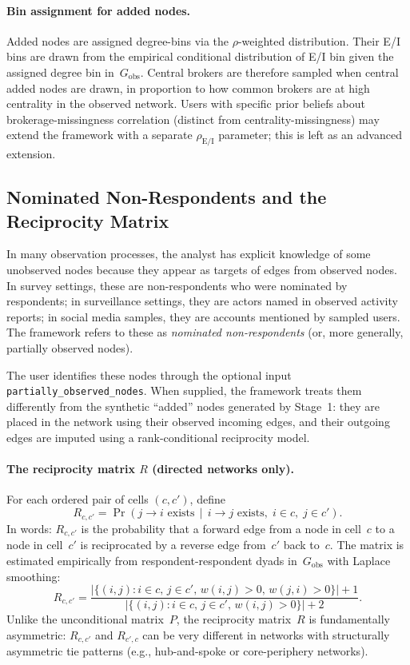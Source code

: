 \documentclass[11pt]{article}
\newcommand{\Gobs}{G_{\text{obs}}}
\newcommand{\EI}{\text{E/I}}
\newcommand{\Rmat}{R}
\newcommand{\Pmat}{P}
\begin{document}
\paragraph{Bin assignment for added nodes.} Added nodes are assigned degree-bins via the $\rho$-weighted distribution. Their E/I bins are drawn from the empirical conditional distribution of E/I bin given the assigned degree bin in~$\Gobs$. Central brokers are therefore sampled when central added nodes are drawn, in proportion to how common brokers are at high centrality in the observed network. Users with specific prior beliefs about brokerage-missingness correlation (distinct from centrality-missingness) may extend the framework with a separate $\rho_{\EI}$ parameter; this is left as an advanced extension.

\subsection{Nominated Non-Respondents and the Reciprocity Matrix}
\label{sec:nominated}

In many observation processes, the analyst has explicit knowledge of some unobserved nodes because they appear as targets of edges from observed nodes. In survey settings, these are non-respondents who were nominated by respondents; in surveillance settings, they are actors named in observed activity reports; in social media samples, they are accounts mentioned by sampled users. The framework refers to these as \emph{nominated non-respondents} (or, more generally, partially observed nodes).

The user identifies these nodes through the optional input \texttt{partially\_observed\_nodes}. When supplied, the framework treats them differently from the synthetic ``added'' nodes generated by Stage~1: they are placed in the network using their observed incoming edges, and their outgoing edges are imputed using a rank-conditional reciprocity model.

\paragraph{The reciprocity matrix $\Rmat$ (directed networks only).} For each ordered pair of cells $(c, c')$, define
\[
\Rmat_{c, c'} = \Pr\left( j \to i \text{ exists} \,\middle|\, i \to j \text{ exists}, \; i \in c, \; j \in c' \right).
\]
In words: $\Rmat_{c, c'}$ is the probability that a forward edge from a node in cell~$c$ to a node in cell~$c'$ is reciprocated by a reverse edge from~$c'$ back to~$c$. The matrix is estimated empirically from respondent-respondent dyads in~$\Gobs$ with Laplace smoothing:
\[
\Rmat_{c, c'} = \frac{|\{(i, j) : i \in c, \, j \in c', \, w(i, j) > 0, \, w(j, i) > 0\}| + 1}{|\{(i, j) : i \in c, \, j \in c', \, w(i, j) > 0\}| + 2}.
\]
Unlike the unconditional matrix~$\Pmat$, the reciprocity matrix~$\Rmat$ is fundamentally asymmetric: $\Rmat_{c, c'}$ and $\Rmat_{c', c}$ can be very different in networks with structurally asymmetric tie patterns (e.g., hub-and-spoke or core-periphery networks).
\end{document}
